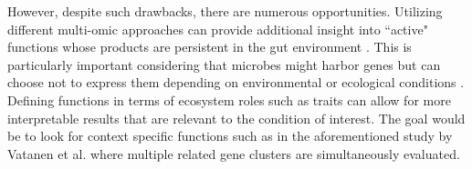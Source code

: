 However, despite such drawbacks, there are numerous opportunities. Utilizing different multi-omic approaches can provide additional insight into ``active" functions whose products are persistent in the gut environment \cite{jiang2016metatranscriptomic}. This is particularly important considering that microbes might harbor genes but can choose not to express them depending on environmental or ecological conditions \cite{metagenomicsofthehumanintestinaltractmetahitconsortium2016transcriptional}. Defining functions in terms of ecosystem roles such as traits \cite{weissman2021exploring} can allow for more interpretable results that are relevant to the condition of interest. The goal would be to look for context specific functions such as in the aforementioned study by Vatanen et al. \cite{vatanen2018human} where multiple related gene clusters are simultaneously evaluated.   